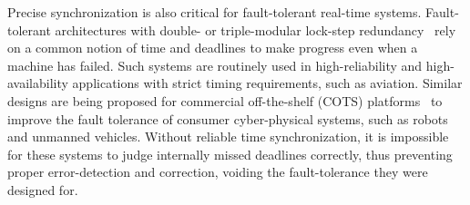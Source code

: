 Precise synchronization is also critical for fault-tolerant real-time systems.
Fault-tolerant architectures with double- or triple-modular lock-step redundancy~\cite{triple-modular-redundancy,triple-modular-redundancy-evaluation,triple-modular-lock-step-arm}
rely on a common notion of time and deadlines to make progress even when a machine has failed.
Such systems are routinely used in high-reliability and high-availability applications with strict timing requirements, such as aviation.
Similar designs are being proposed for commercial off-the-shelf (COTS) platforms~\cite{gujarati2022concretes,gandhi2021rebound,loveless2021igor} to improve the fault tolerance of consumer cyber-physical systems, such as robots and unmanned vehicles.
Without reliable time synchronization, it is impossible for these systems to judge internally missed deadlines correctly, thus preventing proper error-detection and correction, voiding the fault-tolerance they were designed for.


